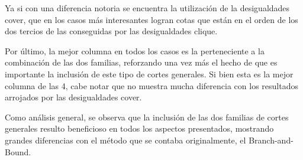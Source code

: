 Ya si con una diferencia notoria se encuentra la utilizaci\'on de la desigualdades cover, que en los casos m\'as interesantes logran cotas que est\'an en el orden de los dos tercios de las conseguidas por las desigualdades clique.

Por \'ultimo, la mejor columna en todos los casos es la perteneciente a la combinaci\'on de las dos familias, reforzando una vez m\'as el hecho de que es importante la inclusi\'on de este tipo de cortes generales. Si bien esta es la mejor columna de las 4, cabe notar que no muestra mucha diferencia con los resultados arrojados por las desigualdades cover.


\bigskip


Como an\'alisis general, se observa que la inclusi\'on de las dos familias de cortes generales resulto beneficioso en todos los aspectos presentados, mostrando grandes diferencias con el m\'etodo que se contaba originalmente, el Branch-and-Bound.
